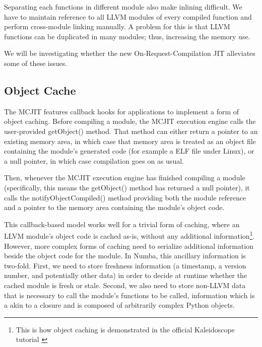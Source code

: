 \documentclass{acm_proc_article-sp}
\begin{document}
Separating each functions in different module also make inlining difficult.
We have to maintain reference to all LLVM modules of every compiled function
and perform cross-module linking manually. A problem for this is that
LLVM functions can be duplicated in many modules; thus, increasing the memory
use.

We will be investigating whether the new On-Request-Compilation JIT
alleviates some of these issues.


\subsection{Object Cache}

The MCJIT features callback hooks for
applications to implement a form of object caching.
Before compiling a module, the MCJIT execution engine
calls the user-provided getObject() method.  That method can either
return a pointer to an existing memory area, in which case that
memory area is treated as an object file containing the module's
generated code (for example a ELF file under Linux), or a null pointer,
in which case compilation goes on as usual.

Then, whenever the MCJIT execution engine has finished compiling a
module (specifically, this means the getObject() method has returned
a null pointer), it calls the notifyObjectCompiled() method providing
both the module reference and a pointer to the memory area containing
the module's object code.

This callback-based model works well for a trivial form of caching,
where an LLVM module's object code is cached as-is, without any
additional information\footnote{This is how object caching is demonstrated in
the official Kaleidoscope tutorial \cite{llvmblog:kaleidoscope}}.
However, more complex forms of
caching need to serialize additional information beside the object code
for the module.  In Numba, this ancillary information is two-fold.  First,
we need to store freshness information (a timestamp, a version number,
and potentially other data) in order to decide at runtime whether the
cached module is fresh or stale.  Second, we also need to store non-LLVM
data that is necessary to call the module's functions to be called,
information which is a akin to a closure and is composed of arbitrarily
complex Python objects.
\end{document}
